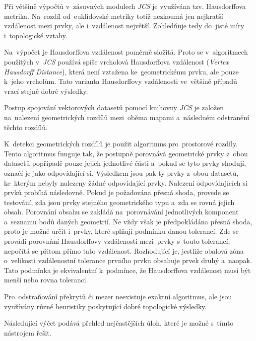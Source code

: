 Při většině výpočtů v~zásuvných modulech \textit{JCS} je využívána tzv. 
Hausdorffova metrika. Na~rozdíl od~euklidovské metriky totiž nezkoumá jen
nejkratší vzdálenost mezi prvky, ale i~vzdálenost největší.
Zohledňuje tedy do~jisté míry i~topologické vztahy.  %

Na~výpočet je Hausdorffova vzdálenost poměrně složitá. Proto se v~algoritmech
použitých v~\textit{JCS} používá spíše vrcholová Hausdorffova vzdálenost 
(\textit{Vertex Hausdorff Distance}), která není vztažena ke~geometrickému 
prvku, ale pouze k~jeho vrcholům. Tato varianta Hausdorffovy vzdálenosti 
ve~většině případů vrací stejně dobré výsledky. 

Postup spojování vektorových datasetů pomocí knihovny \textit{JCS} je založen
na~nalezení geometrických rozdílů mezi~oběma mapami a~následném odstranění 
těchto rozdílů.

K~detekci geometrických rozdílů je použit algoritmus pro~prostorové rozdíly.
Tento algoritmus funguje tak, že postupně porovnává geometrické prvky z~obou 
datasetů popřípadě pouze jejich jednotlivé části a~pokud se tyto prvky shodují,
označí je jako odpovídající si. Výsledkem jsou pak ty prvky z~obou datasetů, 
ke~kterým nebyly nalezeny žádné odpovídající prvky. Nalezení odpovídajících si
prvků probíhá následovně. Pokud je požadována přesná shoda, provede se 
testování, zda jsou prvky stejného geometrického typu a~zda se rovná jejich 
obsah. Porovnání obsahu se zakládá na~porovnávání jednotlivých komponent 
a~seznamu bodů daných geometrií. Ne vždy však je předpokládána přesná shoda,
proto je možné určit i~prvky, které splňují podmínku danou tolerancí. Zde se
provádí porovnání Hausdorffovy vzdálenosti mezi~prvky s~touto tolerancí, 
nepočítá se přitom přímo tato vzdálenost. Rozhodující je, jestliže obalová 
zóna o~velikosti vzdálenostní tolerance prvního prvku obsahuje prvek druhý 
a~naopak. Tato podmínka je ekvivalentní k~podmínce, že Hausdorffova vzdálenost
musí být menší nebo rovna toleranci. 


Pro~odstraňování překrytů či mezer neexistuje exaktní algoritmus,
ale jsou využívány různé heuristiky poskytující dobré topologické výsledky.

Následující výčet podává přehled nejčastějších úloh, které je možné 
s~tímto nástrojem řešit.

